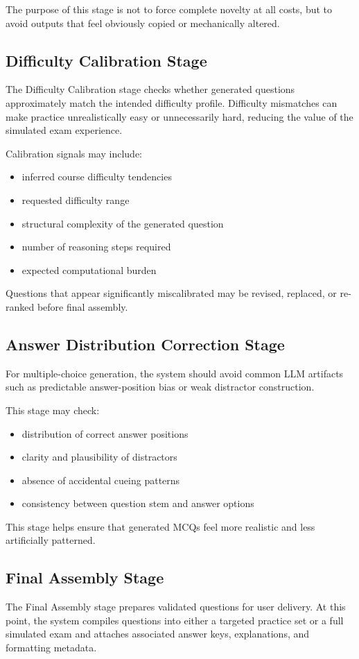 \documentclass[11pt]{article}
\begin{document}
The purpose of this stage is not to force complete novelty at all costs, but to avoid outputs that feel obviously copied or mechanically altered.

\subsection{Difficulty Calibration Stage}
The Difficulty Calibration stage checks whether generated questions approximately match the intended difficulty profile. Difficulty mismatches can make practice unrealistically easy or unnecessarily hard, reducing the value of the simulated exam experience.

Calibration signals may include:
\begin{itemize}
\item inferred course difficulty tendencies
\item requested difficulty range
\item structural complexity of the generated question
\item number of reasoning steps required
\item expected computational burden
\end{itemize}

Questions that appear significantly miscalibrated may be revised, replaced, or re-ranked before final assembly.

\subsection{Answer Distribution Correction Stage}
For multiple-choice generation, the system should avoid common LLM artifacts such as predictable answer-position bias or weak distractor construction.

This stage may check:
\begin{itemize}
\item distribution of correct answer positions
\item clarity and plausibility of distractors
\item absence of accidental cueing patterns
\item consistency between question stem and answer options
\end{itemize}

This stage helps ensure that generated MCQs feel more realistic and less artificially patterned.

\subsection{Final Assembly Stage}
The Final Assembly stage prepares validated questions for user delivery. At this point, the system compiles questions into either a targeted practice set or a full simulated exam and attaches associated answer keys, explanations, and formatting metadata.
\end{document}
